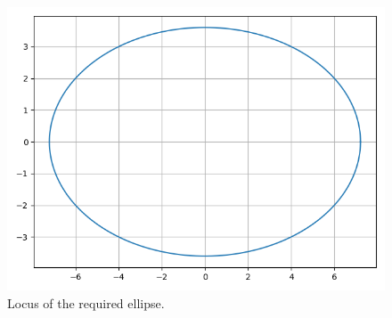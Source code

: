 \documentclass[journal,12pt,twocolumn]{IEEEtran}
\begin{document}
\begin{enumerate}
\begin{figure}[!ht]
        \includegraphics[width=\columnwidth]{figs/ellipse.png}
        \caption{Locus of the required ellipse.}
        \label{fig:ellipse}
    \end{figure}
\end{enumerate}
\end{document}
